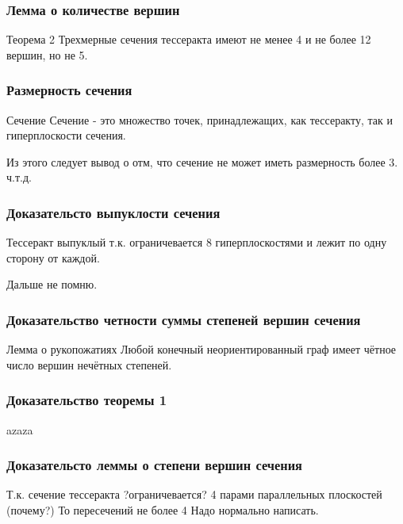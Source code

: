 \documentclass[10pt,pdf,hyperref={unicode}]{beamer}
\begin{document}
\begin{frame}
	\frametitle{Лемма о количестве вершин}
	\begin{block}{Теорема 2}
		Трехмерные сечения тессеракта имеют не менее 4 и не более 12 вершин, но не 5.
	\end{block}
\end{frame}
\begin{frame}
	\frametitle{Размерность сечения}
	\begin{block}{Сечение}
		Сечение - это множество точек, принадлежащих, как тессеракту, так и гиперплоскости сечения.
	\end{block}
	Из этого следует вывод о отм, что сечение не может иметь размерность более 3. 
	ч.т.д.
\end{frame}
\begin{frame}
	\frametitle{Доказательсто выпуклости сечения}
	\begin{block}{Тессеракт выпуклый}
		т.к. ограничевается 8 гиперплоскостями и лежит по одну сторону от каждой.
	\end{block}
	Дальше не помню.	
\end{frame}
\begin{frame}
	\frametitle{Доказательство четности суммы степеней вершин сечения}
	\begin{block}{Лемма о рукопожатиях}
		Любой конечный неориентированный граф имеет чётное число вершин нечётных степеней.
	\end{block}
\end{frame}
\begin{frame}
	\frametitle{Доказательство теоремы 1}
	azaza
\end{frame}
\begin{frame}
	\frametitle{Доказательсто леммы о степени вершин сечения}
	Т.к. сечение тессеракта ?ограничевается? 4 парами параллельных плоскостей (почему?)
	То пересечений не более 4
	Надо нормально написать.
\end{frame}
\end{document}
